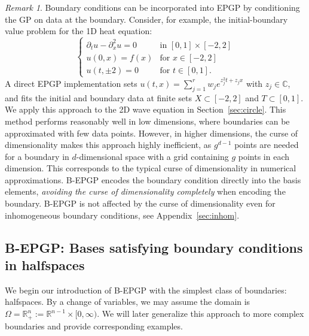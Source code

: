 \documentclass{article} %
\theoremstyle{plain}
\theoremstyle{definition}
\theoremstyle{remark}
\newtheorem{remark}[theorem]{Remark}
\newcommand{\CC}{\mathbb{C}}
\newcommand{\RR}{\mathbb{R}}
\begin{document}
\begin{remark}\label{rem:direct_method}
Boundary conditions can be incorporated into EPGP by conditioning the GP on data at the boundary. Consider, for example, the initial-boundary value problem for the 1D heat equation:
$$
\begin{cases}
    \partial_tu-\partial_x^2u=0&\text{in }[0,1]\times[-2,2]\\
    u(0,x)=f(x)&\text{for }x\in[-2,2]\\
    u(t,\pm2)=0&\text{for }t\in[0,1].
    \end{cases}
$$
A direct EPGP implementation sets
$
u(t,x) = \sum_{j=1}^r w_j e^{z_j^2 t + z_j x}
$
with $z_j \in \CC$, and fits the initial and boundary data at finite sets $X \subset [-2,2]$ and $T \subset [0,1]$. We apply this approach to the 2D wave equation in Section~\ref{sec:circle}.
This method performs reasonably well in low dimensions, where boundaries can be approximated with few data points. However, in higher dimensions, the curse of dimensionality makes this approach highly inefficient, as $g^{d-1}$ points are needed for a boundary in $d$-dimensional space with a grid containing $g$ points in each dimension. This corresponds to the typical curse of dimensionality in numerical approximations. B-EPGP encodes the boundary condition directly into the basis elements, \emph{avoiding the curse of dimensionality completely} when encoding the boundary. B-EPGP is not affected by the curse of dimensionality even for inhomogeneous boundary conditions, see Appendix~\ref{sec:inhom}.
\end{remark}

\subsection{B-EPGP: Bases satisfying boundary conditions in halfspaces}\label{sec:B-EPGP_halfspaces}

We begin our introduction of B-EPGP with the simplest class of boundaries: halfspaces. By a change of variables, we may assume the domain is $\Omega = \RR^n_+ := \RR^{n-1} \times [0, \infty)$. We will later generalize this approach to more complex boundaries and provide corresponding examples.
\end{document}
